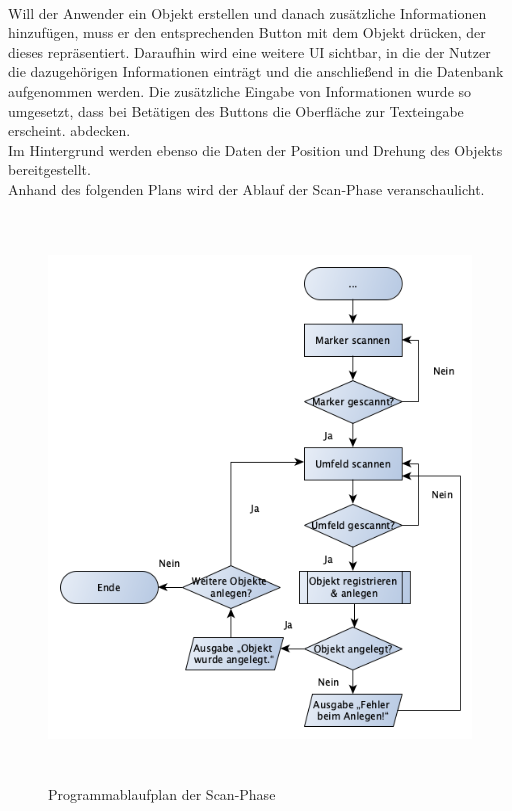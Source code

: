 \pagebreak
\\
Will der Anwender ein Objekt erstellen und danach zusätzliche Informationen hinzufügen, muss er den entsprechenden Button mit dem Objekt drücken, der 
dieses repräsentiert. Daraufhin wird eine weitere \acs{UI} sichtbar, in die der Nutzer die dazugehörigen Informationen einträgt und die anschließend 
in die Datenbank aufgenommen werden. Die zusätzliche Eingabe von Informationen wurde so umgesetzt, dass bei Betätigen des Buttons die Oberfläche zur 
Texteingabe erscheint.
abdecken. 
\\ 
Im Hintergrund werden ebenso die Daten der Position und Drehung des 
Objekts bereitgestellt.
\\ 
Anhand des folgenden Plans wird der Ablauf der Scan-Phase veranschaulicht.
\begin{figure}[hbt!]
    \centering
    \includegraphics[width=15cm,height=15cm,keepaspectratio]{4Umsetzung/Bilder/scanPAP.png}
    \caption{Programmablaufplan der Scan-Phase}
    \label{pic:startmenu}
\end{figure}